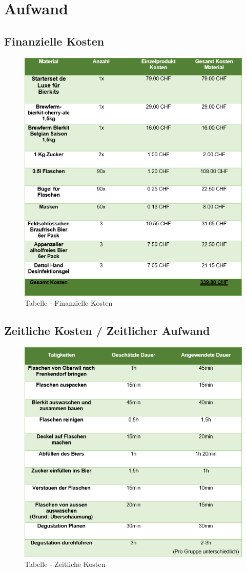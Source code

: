 \newpage
\section{Aufwand}
\subsection{Finanzielle Kosten}
\begin{figure}[!h]
	\centering
	\includegraphics[width=1\columnwidth]{Figures/tabelle1.png}
	\caption{Tabelle - Finanzielle Kosten}
\end{figure}
\newpage
\subsection{Zeitliche Kosten / Zeitlicher Aufwand}
\begin{figure}[!h]
	\centering
	\includegraphics[width=1\columnwidth]{Figures/zeit.png}
	\caption{Tabelle - Zeitliche Kosten}
\end{figure}